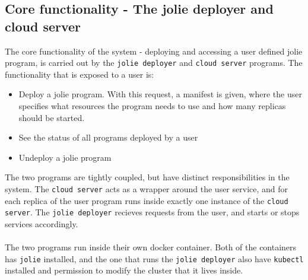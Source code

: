 \documentclass[Report.tex]{subfiles}
\begin{document}
\subsection{Core functionality - The jolie deployer and cloud server}
The core functionality of the system - deploying and accessing a user defined jolie program, is carried out by the {\tt jolie deployer} and {\tt cloud server} programs. The functionality that is exposed to a user is:
\begin{itemize}
\item Deploy a jolie program. With this request, a manifest is given, where the user specifies what resources the program needs to use and how many replicas should be started.
\item See the status of all programs deployed by a user
\item Undeploy a jolie program
\end{itemize}
The two programs are tightly coupled, but have distinct responsibilities in the system. The {\tt cloud server} acts as a wrapper around the user service, and for each replica of the user program runs inside exactly one instance of the {\tt cloud server}. The {\tt jolie deployer} recieves requests from the user, and starts or stops services accordingly.
\\\\
The two programs run inside their own docker container. Both of the containers has {\tt jolie} installed, and the one that runs the {\tt jolie deployer} also have {\tt kubectl} installed and permission to modify the cluster that it lives inside.
\end{document}

